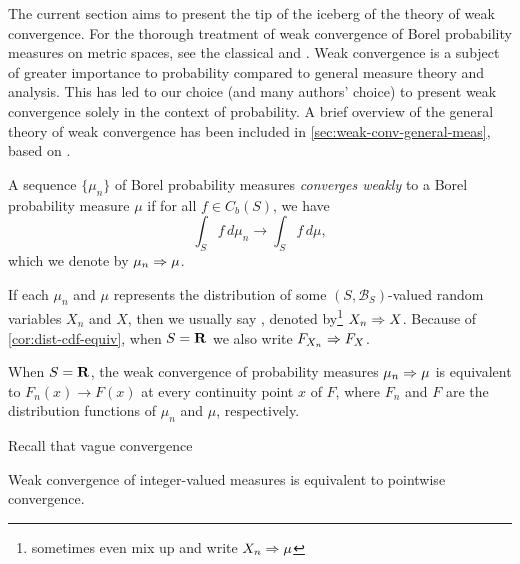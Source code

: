 The current section aims to present the tip of the iceberg of the theory of weak convergence. For the thorough treatment of weak convergence of Borel probability measures on metric spaces, see the classical \cite{Billingsley_1999} and \cite{Parthasarathy_1967}. Weak convergence is a subject of greater importance to probability compared to general measure theory and analysis. This has led to our choice (and many authors' choice) to present weak convergence solely in the context of probability. A brief overview of the general theory of weak convergence has been included in \cref{sec:weak-conv-general-meas}, based on \cite{Bogachev_2018}.

\begin{defn}
    A sequence $\{\mu_n\}$ of Borel probability measures \emph{converges weakly} to a Borel probability measure $\mu$ if for all $f\in C_b(S)$, we have \[
        \int_S f\,d\mu_n \to \int_S f\,d\mu, 
    \]
    which we denote by $\mu_n \Rightarrow \mu$.

    If each $\mu_n$ and $\mu$ represents the distribution of some $(S,\mathcal B_S)$-valued random variables $X_n$ and $X$, then we usually say , denoted by\footnote{sometimes even mix up and write $X_n \Rightarrow \mu$} $X_n \Rightarrow X$. Because of \cref{cor:dist-cdf-equiv}, when $S = \mathbf{R}$ we also write $F_{X_n} \Rightarrow F_{X}$.
\end{defn}

\begin{thm}
    When $S = \mathbf{R}$, the weak convergence of probability measures $\mu_n \Rightarrow \mu$ is equivalent to $F_n(x) \to F(x)$ at every continuity point $x$ of $F$, where $F_n$ and $F$ are the distribution functions of $\mu_n$ and $\mu$, respectively.
\end{thm}

Recall that vague convergence

\begin{prop}
    Weak convergence of integer-valued measures is equivalent to pointwise convergence.
\end{prop}

